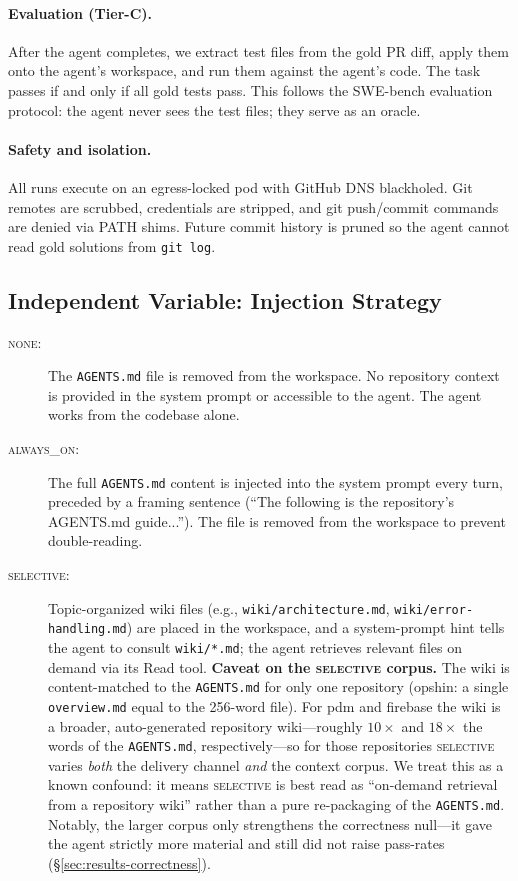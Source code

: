 \documentclass[11pt]{article}
\newcommand{\agentsmd}{\texttt{AGENTS.md}}
\newcommand{\none}{\textsc{none}}
\newcommand{\alwayson}{\textsc{always\_on}}
\newcommand{\selective}{\textsc{selective}}
\begin{document}
\paragraph{Evaluation (Tier-C).}
After the agent completes, we extract test files from the gold PR diff, apply them onto the agent's workspace, and run them against the agent's code.
The task passes if and only if all gold tests pass.
This follows the SWE-bench evaluation protocol: the agent never sees the test files; they serve as an oracle.

\paragraph{Safety and isolation.}
All runs execute on an egress-locked pod with GitHub DNS blackholed.
Git remotes are scrubbed, credentials are stripped, and git push/commit commands are denied via PATH shims.
Future commit history is pruned so the agent cannot read gold solutions from \texttt{git log}.

\subsection{Independent Variable: Injection Strategy}
\label{sec:iv}

\begin{description}
    \item[\none:] The \agentsmd{} file is removed from the workspace. No repository context is provided in the system prompt or accessible to the agent. The agent works from the codebase alone.
    \item[\alwayson:] The full \agentsmd{} content is injected into the system prompt every turn, preceded by a framing sentence (``The following is the repository's AGENTS.md guide...'').  The file is removed from the workspace to prevent double-reading.
    \item[\selective:] Topic-organized wiki files (e.g., \texttt{wiki/architecture.md}, \texttt{wiki/error-handling.md}) are placed in the workspace, and a system-prompt hint tells the agent to consult \texttt{wiki/*.md}; the agent retrieves relevant files on demand via its Read tool. \textbf{Caveat on the \selective{} corpus.} The wiki is content-matched to the \agentsmd{} for only one repository (opshin: a single \texttt{overview.md} equal to the 256-word file). For pdm and firebase the wiki is a broader, auto-generated repository wiki---roughly $10\times$ and $18\times$ the words of the \agentsmd{}, respectively---so for those repositories \selective{} varies \emph{both} the delivery channel \emph{and} the context corpus. We treat this as a known confound: it means \selective{} is best read as ``on-demand retrieval from a repository wiki'' rather than a pure re-packaging of the \agentsmd{}. Notably, the larger corpus only strengthens the correctness null---it gave the agent strictly more material and still did not raise pass-rates (\S\ref{sec:results-correctness}).
\end{description}
\end{document}
